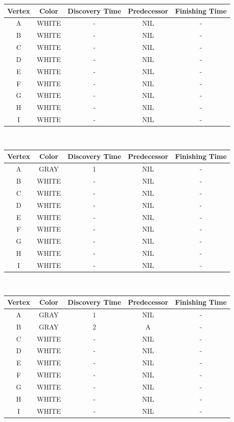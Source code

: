 \documentclass[12pt]{article}
\theoremstyle{plain}
\newcommand{\vs}{\vspace{2mm}}
\begin{document}
\newpage
{}
\begin{tabular}{|c|c|c|c|c|}
    \hline
    Vertex & Color & Discovery Time & Predecessor & Finishing Time \\ \hline
    A & WHITE & - & NIL & - \\ \hline
    B & WHITE & - & NIL & - \\ \hline
    C & WHITE & - & NIL & - \\ \hline
    D & WHITE & - & NIL & - \\ \hline
    E & WHITE & - & NIL & - \\ \hline
    F & WHITE & - & NIL & - \\ \hline
    G & WHITE & - & NIL & - \\ \hline
    H & WHITE & - & NIL & - \\ \hline
    I & WHITE & - & NIL & - \\ \hline
\end{tabular}
\vs\

\begin{tabular}{|c|c|c|c|c|}
    \hline
    Vertex & Color & Discovery Time & Predecessor & Finishing Time \\ \hline
    A & GRAY & 1 & NIL & - \\ \hline
    B & WHITE & - & NIL & - \\ \hline
    C & WHITE & - & NIL & - \\ \hline
    D & WHITE & - & NIL & - \\ \hline
    E & WHITE & - & NIL & - \\ \hline
    F & WHITE & - & NIL & - \\ \hline
    G & WHITE & - & NIL & - \\ \hline
    H & WHITE & - & NIL & - \\ \hline
    I & WHITE & - & NIL & - \\ \hline
\end{tabular}
\vs\

\begin{tabular}{|c|c|c|c|c|}
    \hline
    Vertex & Color & Discovery Time & Predecessor & Finishing Time \\ \hline
    A & GRAY & 1 & NIL & - \\ \hline
    B & GRAY & 2 & A & - \\ \hline
    C & WHITE & - & NIL & - \\ \hline
    D & WHITE & - & NIL & - \\ \hline
    E & WHITE & - & NIL & - \\ \hline
    F & WHITE & - & NIL & - \\ \hline
    G & WHITE & - & NIL & - \\ \hline
    H & WHITE & - & NIL & - \\ \hline
    I & WHITE & - & NIL & - \\ \hline
\end{tabular}
\vs\
\end{document}
